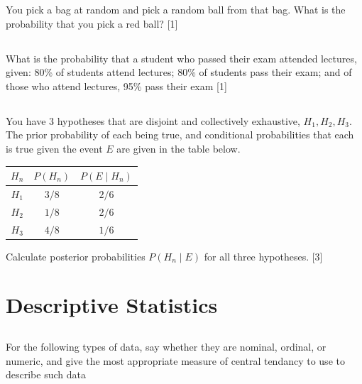 \documentclass[twocolumn]{article}
\newcounter{pmarks}
\newcounter{marks}
\newcommand\mrk[1]{{\hfill\color{blue}\small[{#1}]}\addtocounter{pmarks}{#1}\addtocounter{marks}{#1}}
\begin{document}
    You pick a bag at random and pick a random ball from that bag. What is the probability that you pick a red ball? \mrk{1}

\subsection{}

    What is the probability that a student who passed their exam attended lectures, given: 80\% of students attend lectures; 80\% of students pass their exam; and of those who attend lectures, 95\% pass their exam
\mrk{1}
    
\subsection{}

    You have 3 hypotheses that are disjoint and collectively exhaustive, $H_1, H_2, H_3$. The prior probability of each being true, and conditional probabilities that each is true given the event $E$ are given in the table below.

    \begin{table}[h!]
        \centering
        \begin{tabular}{c | c | c }
            \toprule
            $H_n$ & $P(H_n)$ & $P(E \mid H_n)$ \\
            \midrule
            $H_1$ & ${3}/{8}$ & ${2}/{6}$  \\
            $H_2$ & ${1}/{8}$ & ${2}/{6}$  \\
            $H_3$ & ${4}/{8}$ & ${1}/{6}$ \\
            \bottomrule
        \end{tabular}
    \end{table}

    Calculate posterior probabilities $P( H_n \mid E)$ for all three hypotheses. \mrk{3}
    

\clearpage
\setcounter{page}{12}
\setcounter{section}{11}
\section{Descriptive Statistics}

\subsection{}

    For the following types of data, say whether they are nominal, ordinal, or numeric, and give the most appropriate measure of central tendancy to use to describe such data
\end{document}
